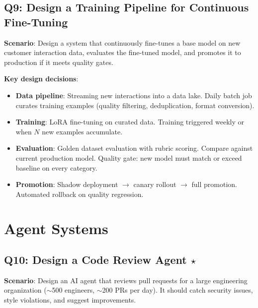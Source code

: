 \subsection{Q9: Design a Training Pipeline for Continuous Fine-Tuning}

\textbf{Scenario}: Design a system that continuously fine-tunes a base model on new customer interaction data, evaluates the fine-tuned model, and promotes it to production if it meets quality gates.

\textbf{Key design decisions}:
\begin{itemize}[leftmargin=*]
    \item \textbf{Data pipeline}: Streaming new interactions into a data lake. Daily batch job curates training examples (quality filtering, deduplication, format conversion).
    \item \textbf{Training}: LoRA fine-tuning on curated data. Training triggered weekly or when $N$ new examples accumulate.
    \item \textbf{Evaluation}: Golden dataset evaluation with rubric scoring. Compare against current production model. Quality gate: new model must match or exceed baseline on every category.
    \item \textbf{Promotion}: Shadow deployment $\to$ canary rollout $\to$ full promotion. Automated rollback on quality regression.
\end{itemize}


\section{Agent Systems}

\subsection{Q10: Design a Code Review Agent $\star$}

\textbf{Scenario}: Design an AI agent that reviews pull requests for a large engineering organization ($\sim$500 engineers, $\sim$200 PRs per day). It should catch security issues, style violations, and suggest improvements.


